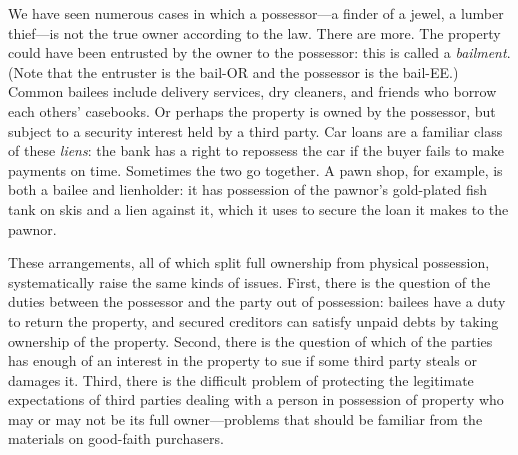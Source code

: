 
We have seen numerous cases in which a possessor---a finder of a
jewel, a lumber thief---is not the true owner according to the law. There are
more. The property could have been entrusted by the owner to the possessor:
this is called a \textit{bailment}. (Note that the entruster is the bail-OR and
the possessor is the bail-EE.) Common bailees include delivery services, dry
cleaners, and friends who borrow each others' casebooks. Or perhaps the
property is owned by the possessor, but subject to a security interest held by
a third party. Car loans are a familiar class of these \textit{liens}: the bank
has a right to repossess the car if the buyer fails to make payments on time.
Sometimes the two go together. A pawn shop, for example, is both a bailee and
lienholder: it has possession of the pawnor's gold-plated fish tank on skis and
a lien against it, which it uses to secure the loan it makes to the pawnor.

These arrangements, all of which split full ownership from physical possession,
systematically raise the same kinds of issues. First, there is the question of
the duties between the possessor and the party out of possession: bailees have
a duty to return the property, and secured creditors can satisfy unpaid debts
by taking ownership of the property. Second, there is the question of which of
the parties has enough of an interest in the property to sue if some third
party steals or damages it. Third, there is the difficult problem of protecting
the legitimate expectations of third parties dealing with a person in
possession of property who may or may not be its full owner---problems that
should be familiar from the materials on good-faith purchasers.

